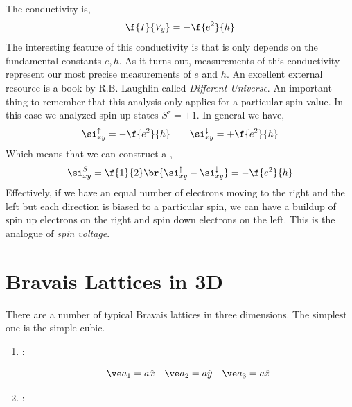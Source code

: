 \documentclass{article}
\begin{document}
The conductivity is,
\[ \f{I}{V_{y}} = - \f{e^2}{h} \]
The interesting feature of this conductivity is that is only depends on the fundamental constants $e, h$. As it turns out, measurements of this conductivity represent our most precise measurements of $e$ and $h$. An excellent external resource is a book by R.B. Laughlin called \textit{Different Universe}. An important thing to remember that this analysis only applies for a particular spin value. In this case we analyzed spin up states $S^{z} = +1$. In general we have,
\[ \si_{xy}^{\uparrow} = -\f{e^2}{h} \qquad \si_{xy}^{\downarrow} = +\f{e^2}{h} \]
Which means that we can construct a ,
\[ \si_{xy}^{S} =\f{1}{2} \br{\si_{xy}^{\uparrow} - \si_{xy}^{\downarrow}} = - \f{e^2}{h} \]
Effectively, if we have an equal number of electrons moving to the right and the left but each direction is biased to a particular spin, we can have a buildup of spin up electrons on the right and spin down electrons on the left. This is the analogue of \textit{spin voltage}. \\

\section{Bravais Lattices in 3D}

There are a number of typical Bravais lattices in three dimensions. The simplest one is the simple cubic.
\begin{enumerate}
    \item {}:
    \begin{center}
    \end{center}
    \[ \ve a_1 = a \hat x \quad \ve a_2 = a \hat y \quad \ve a_3 = a \hat z \]
    \item {}:
\end{enumerate}
\end{document}
